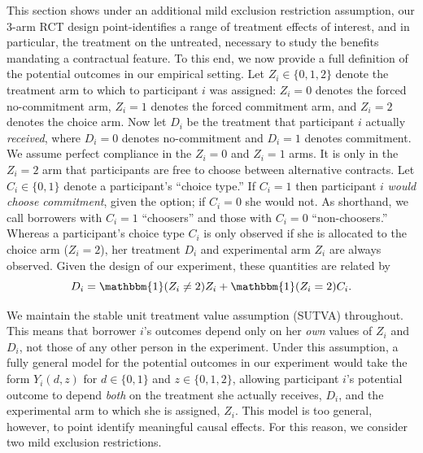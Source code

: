 \documentclass[12pt, a4paper]{article}
\begin{document}
This section shows under an additional mild exclusion restriction assumption, our 3-arm RCT design point-identifies a range of treatment effects of interest, and in particular, the treatment on the untreated, necessary to study the benefits mandating a contractual feature. To this end, we now provide a full definition of the potential outcomes in our empirical setting. Let $Z_i \in \{0, 1, 2\}$ denote the treatment arm to which to participant $i$ was assigned: $Z_i = 0$ denotes the forced no-commitment arm, $Z_i = 1$ denotes the forced commitment arm, and $Z_i = 2$ denotes the choice arm. 
Now let $D_i$ be the treatment that participant $i$ actually \emph{received}, where $D_i = 0$ denotes no-commitment and $D_i = 1$ denotes commitment. 
We assume perfect compliance in the $Z_i = 0$ and $Z_i = 1$ arms. %
It is only in the $Z_i = 2$ arm that participants are free to choose between alternative contracts. 
Let $C_i \in \{0, 1 \}$ denote a participant's ``choice type.'' If $C_i = 1$ then participant $i$ \emph{would choose commitment}, given the option; if $C_i = 0$ she would not. 
As shorthand, we call borrowers with $C_i = 1$ ``choosers'' and those with $C_i = 0$ ``non-choosers.''
Whereas a participant's choice type $C_i$ is only observed if she is allocated to the choice arm ($Z_i = 2$), her treatment $D_i$ and experimental arm $Z_i$ are always observed. 
Given the design of our experiment, these quantities are related by
\begin{equation}
D_i = \mathbbm{1}(Z_i \neq 2) Z_i + \mathbbm{1}(Z_i = 2) C_i.
\label{eq:potentialTreatments}
\end{equation}

We maintain the stable unit treatment value assumption (SUTVA) throughout. 
This means that borrower $i$'s outcomes depend only on her \emph{own} values of $Z_i$ and $D_i$, not those of any other person in the experiment. 
Under this assumption, a fully general model for the potential outcomes in our experiment would take the form $Y_i(d, z)$ for $d\in \{0,1\}$ and $z \in \{0, 1, 2\}$, allowing participant $i$'s potential outcome to depend \emph{both} on the treatment she actually receives, $D_i$, and the experimental arm to which she is assigned, $Z_i$. 
This model is too general, however, to point identify meaningful causal effects. 
For this reason, we consider two mild exclusion restrictions.
\end{document}
